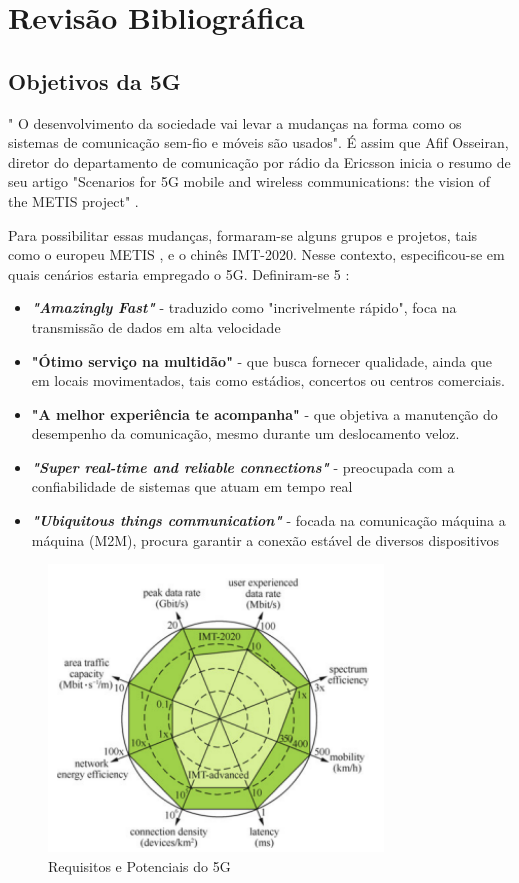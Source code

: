 \chapter{Revisão Bibliográfica} \label{capitulo1}

\section{Objetivos da 5G} 
" O desenvolvimento da sociedade vai levar a mudanças na forma como os sistemas de comunicação sem-fio e móveis são usados". É assim que Afif Osseiran, diretor do departamento de comunicação por rádio da Ericsson inicia o resumo de seu artigo "Scenarios for 5G mobile and wireless communications: the vision of the METIS project" \cite{Afif}. 
\par Para possibilitar essas mudanças, formaram-se alguns grupos e projetos, tais como o europeu METIS \cite{Roh}, e o chinês IMT-2020. Nesse contexto, especificou-se em quais cenários estaria empregado o 5G. Definiram-se 5 \cite{Afif}:
\begin{itemize}
\item \textbf{\textit{"Amazingly Fast"}} - traduzido como "incrivelmente rápido", foca na transmissão de dados em alta velocidade 
\item \textbf{"Ótimo serviço na multidão"} - que busca fornecer qualidade, ainda que em locais movimentados, tais como estádios, concertos ou centros comerciais. 
\item \textbf{"A melhor experiência te acompanha"} - que objetiva a manutenção do desempenho da comunicação, mesmo durante um deslocamento veloz. 
\item \textbf{\textit{"Super real-time and reliable connections"}} - preocupada com a confiabilidade de sistemas que atuam em tempo real
\item \textbf{\textit{"Ubiquitous things communication"}} - focada na comunicação máquina a máquina (M2M), procura garantir a conexão estável de diversos dispositivos 
\end{itemize}

\begin{figure}[h!]
\centering
\includegraphics[width=3.5in]{req_pot5G.png}
\caption{Requisitos e Potenciais do 5G \cite{MetisD28}}
\label{req_pot5G}
\end{figure}

